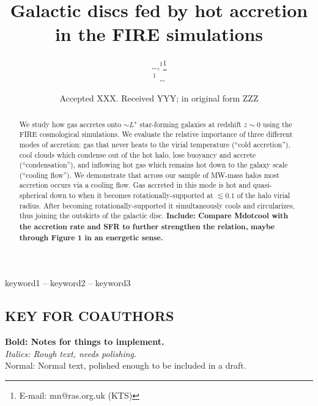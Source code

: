 \documentclass[fleqn,usenatbib]{mnras}
\title[Hot Accretion in FIRE]{Galactic discs fed by hot accretion in the FIRE simulations}
\author[\ldots]{
\ldots,$^{1}$\thanks{E-mail: mn@ras.org.uk (KTS)}
\\
$^1$ \ldots
}
\date{Accepted XXX. Received YYY; in original form ZZZ}
\begin{document}
\label{firstpage}
\pagerange{\pageref{firstpage}--\pageref{lastpage}}
\maketitle

\begin{abstract}
We study how gas accretes onto $\sim L^\star$ star-forming galaxies at redshift $z\sim0$ using the FIRE cosmological simulations.
We evaluate the relative importance of three different modes of accretion: 
gas that never heats to the virial temperature (``cold accretion''), 
cool clouds which condense out of the hot halo, lose buoyancy and accrete  (``condensation''), 
and inflowing hot gas which remains hot down to the galaxy scale (``cooling flow'').
We demonstrate that across our sample of MW-mass halos most accretion occurs via a cooling flow.
Gas accreted in this mode is hot and quasi-spherical down to when it becomes rotationally-supported at $\lesssim 0.1$ of the halo virial radius.
After becoming rotationally-supported it simultaneously cools and circularizes, thus joining the outskirts of the galactic disc. 
\textbf{
Include: Compare Mdotcool with the accretion rate and SFR to further strengthen the relation, maybe through Figure 1 in an energetic sense.
}
\end{abstract}

\begin{keywords}
keyword1 -- keyword2 -- keyword3
\end{keywords}



\subsection{ KEY FOR COAUTHORS}
\textbf{Bold: Notes for things to implement.} \\
\textit{Italics: Rough text, needs polishing.} \\
Normal: Normal text, polished enough to be included in a draft.
\end{document}
